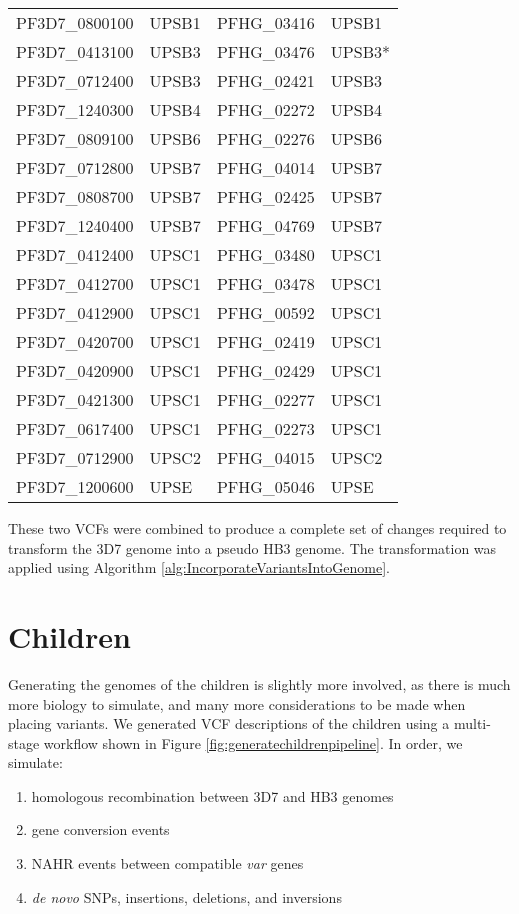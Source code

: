 \begin{table}[]
\begin{tabular}{@{}llll@{}}
PF3D7\_0800100 & UPSB1 & PFHG\_03416 & UPSB1 \\
PF3D7\_0413100 & UPSB3 & PFHG\_03476 & UPSB3* \\
PF3D7\_0712400 & UPSB3 & PFHG\_02421 & UPSB3 \\
PF3D7\_1240300 & UPSB4 & PFHG\_02272 & UPSB4 \\
PF3D7\_0809100 & UPSB6 & PFHG\_02276 & UPSB6 \\
PF3D7\_0712800 & UPSB7 & PFHG\_04014 & UPSB7 \\
PF3D7\_0808700 & UPSB7 & PFHG\_02425 & UPSB7 \\
PF3D7\_1240400 & UPSB7 & PFHG\_04769 & UPSB7 \\
PF3D7\_0412400 & UPSC1 & PFHG\_03480 & UPSC1 \\
PF3D7\_0412700 & UPSC1 & PFHG\_03478 & UPSC1 \\
PF3D7\_0412900 & UPSC1 & PFHG\_00592 & UPSC1 \\
PF3D7\_0420700 & UPSC1 & PFHG\_02419 & UPSC1 \\
PF3D7\_0420900 & UPSC1 & PFHG\_02429 & UPSC1 \\
PF3D7\_0421300 & UPSC1 & PFHG\_02277 & UPSC1 \\
PF3D7\_0617400 & UPSC1 & PFHG\_02273 & UPSC1 \\
PF3D7\_0712900 & UPSC2 & PFHG\_04015 & UPSC2 \\
PF3D7\_1200600 & UPSE  & PFHG\_05046 & UPSE  \\
\bottomrule
\end{tabular}
\end{table}

These two VCFs were combined to produce a complete set of changes required to transform the 3D7 genome into a pseudo HB3 genome.  The transformation was applied using Algorithm \ref{alg:IncorporateVariantsIntoGenome}.

\section{Children}

Generating the genomes of the children is slightly more involved, as there is much more biology to simulate, and many more considerations to be made when placing variants. We generated VCF descriptions of the children using a multi-stage workflow shown in Figure \ref{fig:generatechildrenpipeline}.  In order, we simulate:

\begin{enumerate}
    \item homologous recombination between 3D7 and HB3 genomes
    \item gene conversion events
    \item NAHR events between compatible \textit{var} genes
    \item \textit{de novo} SNPs, insertions, deletions, and inversions
\end{enumerate}

